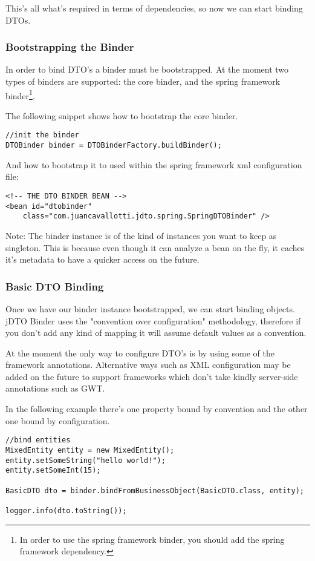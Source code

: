 \documentclass[12pt]{article}
\newcommand{\JDTO}{jDTO Binder }
\begin{document}
This's all what's required in terms of dependencies, so now we can start binding DTOs.

\subsubsection{Bootstrapping the Binder}


In order to bind DTO's a binder must be bootstrapped. At the moment two types of binders
are supported: the core binder, and the spring framework binder\footnote{In order to use the spring framework binder, you should add the spring framework dependency.}.


The following snippet shows how to bootstrap the core binder.

\begin{verbatim}
//init the binder
DTOBinder binder = DTOBinderFactory.buildBinder();
\end{verbatim}


And how to bootstrap it to used within the spring framework xml configuration file:


\begin{verbatim}
<!-- THE DTO BINDER BEAN --> 
<bean id="dtobinder" 
    class="com.juancavallotti.jdto.spring.SpringDTOBinder" />
\end{verbatim}

Note: The binder instance is of the kind of instances you want to keep as singleton. This is because even though it can analyze a bean on the fly, it caches it's metadata to have a quicker access on the future.

\subsubsection{Basic DTO Binding}

Once we have our binder instance bootstrapped, we can start binding objects. \JDTO uses the "convention over configuration"
methodology, therefore if you don't add any kind of mapping it will assume default values as a convention. 

At the moment the only way to configure DTO's is by using some of the framework annotations. Alternative ways such as XML configuration may be added on the future to support frameworks which don't take kindly server-side annotations such as GWT.

In the following example there's one property bound by convention and the other one bound by configuration.

\begin{verbatim}
//bind entities
MixedEntity entity = new MixedEntity();
entity.setSomeString("hello world!");
entity.setSomeInt(15);
        
BasicDTO dto = binder.bindFromBusinessObject(BasicDTO.class, entity);
        
logger.info(dto.toString());
\end{verbatim}
\end{document}
